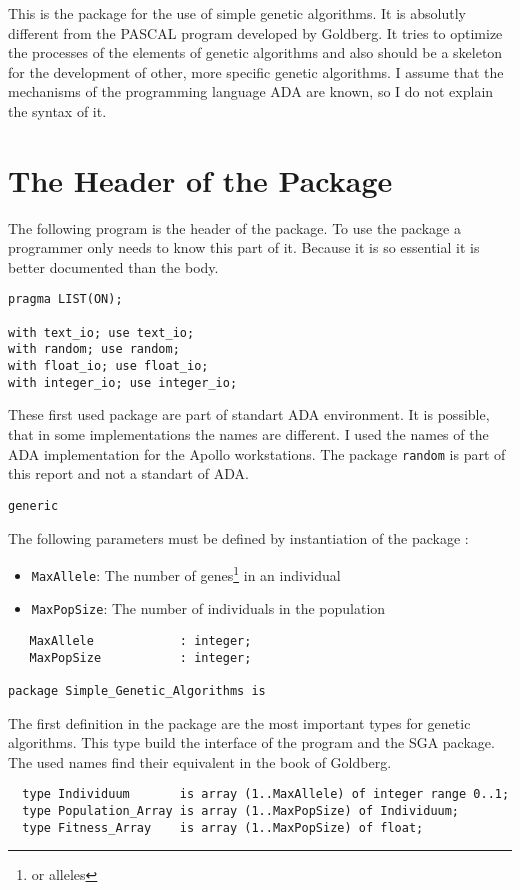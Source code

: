 This is the package for the use of simple genetic algorithms. It is absolutly
different from the PASCAL program developed by Goldberg\cite{Gol89}. It tries
to optimize the processes of the elements of genetic algorithms and also should
be a skeleton for the development of other, more specific genetic algorithms.
I assume that the mechanisms of the programming language ADA are known, so I
do not explain the syntax of it.
\section{The Header of the Package}
The following program is the header of the package. To use the package a programmer
only needs to know this part of it. Because it is so essential it is better
documented than the body.
\begin{verbatim}
pragma LIST(ON);

with text_io; use text_io;
with random; use random;
with float_io; use float_io;
with integer_io; use integer_io;
\end{verbatim}
These first used package are part of standart ADA environment. It is possible,
that in some implementations the names are different. I used the names of the
ADA implementation for the Apollo workstations. The package {\tt random} is part
of this report and not a standart of ADA.
\begin{verbatim}
generic
\end{verbatim}
The following parameters must be defined by instantiation of the package :
\begin{itemize}
  \item {\tt MaxAllele}: The number of genes\footnote{or alleles} in an individual
  \item {\tt MaxPopSize}: The number of individuals in the population
\end{itemize}
\begin{verbatim}
   MaxAllele            : integer;
   MaxPopSize           : integer;

package Simple_Genetic_Algorithms is
\end{verbatim}
The first definition in the package are the most important types for genetic
algorithms. This type build the interface of the program and the SGA package.
The used names find their equivalent in the book of Goldberg\cite{Gol89}.
\begin{verbatim}
  type Individuum       is array (1..MaxAllele) of integer range 0..1;
  type Population_Array is array (1..MaxPopSize) of Individuum;
  type Fitness_Array    is array (1..MaxPopSize) of float;
\end{verbatim}
